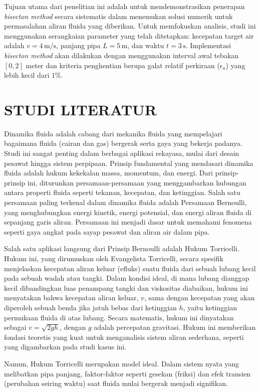 \documentclass[conference]{IEEEtran}
\begin{document}
Tujuan utama dari penelitian ini adalah untuk mendemonstrasikan penerapan \textit{bisecton method} secara sistematis dalam menemukan solusi numerik untuk permasalahan aliran fluida yang diberikan. Untuk memfokuskan analisis, studi ini menggunakan serangkaian parameter yang telah ditetapkan: kecepatan target air adalah $v = 4 \, \text{m/s}$, panjang pipa $L = 5 \, \text{m}$, dan waktu $t = 3 \, \text{s}$. Implementasi \textit{bisecton method} akan dilakukan dengan menggunakan interval awal tebakan $[0, 2]$ meter dan kriteria penghentian berupa galat relatif perkiraan ($\epsilon_a$) yang lebih kecil dari $1\%$.

\section{STUDI LITERATUR}
Dinamika fluida adalah cabang dari mekanika fluida yang mempelajari bagaimana fluida (cairan dan gas) bergerak serta gaya yang bekerja padanya. Studi ini sangat penting dalam berbagai aplikasi rekayasa, mulai dari desain pesawat hingga sistem perpipaan. Prinsip fundamental yang mendasari dinamika fluida adalah hukum kekekalan massa, momentum, dan energi. Dari prinsip-prinsip ini, diturunkan persamaan-persamaan yang menggambarkan hubungan antara properti fluida seperti tekanan, kecepatan, dan ketinggian. Salah satu persamaan paling terkenal dalam dinamika fluida adalah Persamaan Bernoulli, yang menghubungkan energi kinetik, energi potensial, dan energi aliran fluida di sepanjang garis aliran. Persamaan ini menjadi dasar untuk memahami fenomena seperti gaya angkat pada sayap pesawat dan aliran air dalam pipa.

Salah satu aplikasi langsung dari Prinsip Bernoulli adalah Hukum Torricelli. Hukum ini, yang dirumuskan oleh Evangelista Torricelli, secara spesifik menjelaskan kecepatan aliran keluar (efluks) suatu fluida dari sebuah lubang kecil pada sebuah wadah atau tangki. Dalam kondisi ideal, di mana lubang dianggap kecil dibandingkan luas penampang tangki dan viskositas diabaikan, hukum ini menyatakan bahwa kecepatan aliran keluar, $v$, sama dengan kecepatan yang akan diperoleh sebuah benda jika jatuh bebas dari ketinggian $h$, yaitu ketinggian permukaan fluida di atas lubang. Secara matematis, hukum ini dinyatakan sebagai $v = \sqrt{2gh}$, dengan $g$ adalah percepatan gravitasi. Hukum ini memberikan fondasi teoretis yang kuat untuk menganalisis sistem aliran sederhana, seperti yang digambarkan pada studi kasus ini.

Namun, Hukum Torricelli merupakan model ideal. Dalam sistem nyata yang melibatkan pipa panjang, faktor-faktor seperti gesekan (friksi) dan efek transien (perubahan seiring waktu) saat fluida mulai bergerak menjadi signifikan. 
\end{document}
